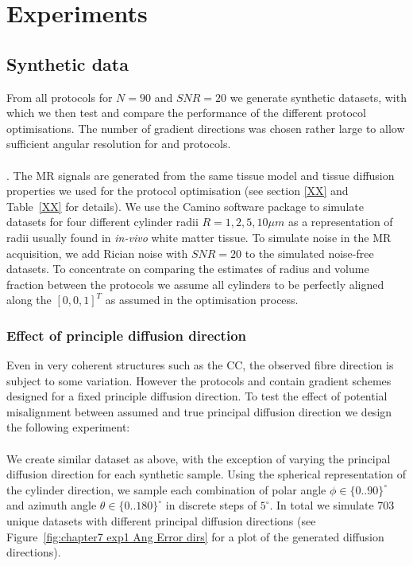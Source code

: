 \section{Experiments}
\subsection{Synthetic data}
From all protocols for $N=90$ and $SNR=20$ we generate synthetic datasets, with which we then test and compare the performance of the different protocol optimisations. The number of gradient directions was chosen rather large to allow sufficient angular resolution for {\OI} and {\DO} protocols.
\paragraph{}
\label{sec: chapter 6 fibre distribution perfect}.
 The MR signals are generated from the same tissue model and tissue diffusion properties we used for the protocol optimisation (see section \ref{XX} and Table~\ref{XX} for details). We use the Camino software package \citep{Cook:2006} to simulate datasets for four different cylinder radii $R={1,2,5,10}\mu m$ as a representation of radii usually found in \emph{in-vivo} white matter tissue. To simulate noise in the MR acquisition, we add Rician noise with $SNR=20$ to the simulated noise-free datasets. To concentrate on comparing the estimates of radius and volume fraction between the protocols we assume all cylinders to be perfectly aligned along the $[0,0,1]^T$ as assumed in the optimisation process.

\subsubsection*{Effect of principle diffusion direction}
Even in very coherent structures such as the \gls{CC}, the observed fibre direction is subject to some variation. However the protocols {\FD} and {\DO} contain gradient schemes designed for a fixed principle diffusion direction. To test the effect of potential misalignment between assumed and true principal diffusion direction we design the following experiment:
\paragraph{}
We create similar dataset as above, with the exception of varying the principal diffusion direction for each synthetic sample. Using the spherical representation of the cylinder direction, we sample each combination of polar angle $\phi \in \{0..90\}^\circ$ and azimuth angle $\theta \in \{0..180\}^\circ$ in discrete steps of $5^\circ$. In total we simulate 703 unique datasets with different principal diffusion directions (see Figure~\ref{fig:chapter7 exp1 Ang Error dirs} for a plot of the generated diffusion directions).

